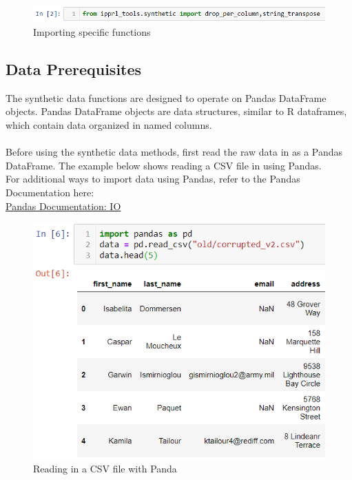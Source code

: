 \documentclass[titlepage, 11pt]{article}
\begin{document}
\begin{figure}[H]
    \centering
    \includegraphics{imgs/Import2}
    \caption{Importing specific functions}
    \label{fig:my_label}
\end{figure}

\subsection{Data Prerequisites}
The synthetic data functions are designed to operate on Pandas DataFrame objects. Pandas DataFrame objects are data structures, similar to R dataframes, which contain data organized in named columns. 
\\
\\
\noindent Before using the synthetic data methods, first read the raw data in as a Pandas DataFrame. The example below shows reading a CSV file in using Pandas.
\\
\noindent For additional ways to import data using Pandas, refer to the Pandas Documentation here:
\\
\href{https://pandas.pydata.org/pandas-docs/stable/user_guide/io.html}{Pandas Documentation: IO}
\\

\begin{figure}[H]
    \centering
    \includegraphics{imgs/PandasRead.png}
    \caption{Reading in a CSV file with Panda}
    \label{fig:my_label}
\end{figure}
\end{document}

